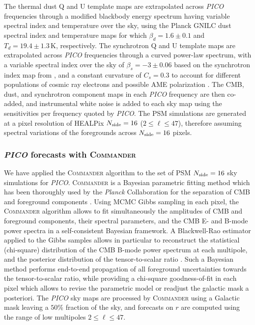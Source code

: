 \documentclass[PICOReport.tex]{subfiles}
\begin{document}
The thermal dust Q and U template maps are extrapolated across \emph{PICO} frequencies through a modified blackbody energy spectrum having variable spectral index and temperature over the sky, using the Planck {\sc GNILC} dust spectral index and temperature maps for which ${\beta_d = 1.6\pm 0.1}$ and ${T_d=19.4 \pm 1.3}$\,K, respectively. The synchrotron Q and U template maps are extrapolated across \emph{PICO} frequencies through a curved power-law spectrum, with a variable spectral index over the sky of ${\beta_s = -3\pm 0.06}$ based on the synchrotron index map from \cite{Miville-Deschenes/etal:2008}, and a constant curvature of $C_s = 0.3$ \cite{Kogut/etal:2007} to account for different populations of cosmic ray electrons  and possible AME polarization \cite{dickinson/etal:2018}. The CMB, dust, and synchrotron component maps in each \emph{PICO} frequency are then co-added, and instrumental white noise is added to each sky map using the sensitivities per frequency quoted by \emph{PICO}.
The PSM simulations are generated at a pixel resolution of HEALPix \cite{gorski/etal:2005} $N_{\rm side}=16$ ($2 \leq \ell \leq 47$), therefore assuming spectral variations of the foregrounds across $N_{\rm side}=16$ pixels.

\subsubsection{\emph{PICO} forecasts with \textsc{Commander}}

We have applied the \textsc{Commander} algorithm \cite{eriksen/etal:2008} to the set of PSM $N_{\rm side}=16$ sky simulations for \emph{PICO}.
\textsc{Commander} is a Bayesian parametric fitting method which has been thoroughly used by the \emph{Planck} Collaboration for the separation of CMB and foreground components \cite{Planck_2015_X,Planck_2018_IV}. Using MCMC Gibbs sampling in each pixel, the \textsc{Commander} algorithm allows to fit simultaneously the amplitudes of CMB and foreground components, their spectral parameters, and the CMB E- and B-mode power spectra in a self-consistent Bayesian framework. A Blackwell-Rao estimator applied to the Gibbs samples allows in particular to reconstruct the statistical (chi-square) distribution of the CMB B-mode power spectrum at each multipole, and the posterior distribution of the tensor-to-scalar ratio \cite{Remazeilles/etal:2016,Remazeilles/etal:2018}. Such a Bayesian method performs end-to-end propagation of all foreground uncertainties towards the tensor-to-scalar ratio, while providing a chi-square goodness-of-fit in each pixel which allows to revise the parametric model or readjust the galactic mask a posteriori. The \emph{PICO} sky maps are processed by \textsc{Commander} using a Galactic mask leaving a $50$\% fraction of the sky, and forecasts on $r$ are computed using the range of low multipoles $2 \leq \ell \leq 47$.
\end{document}

